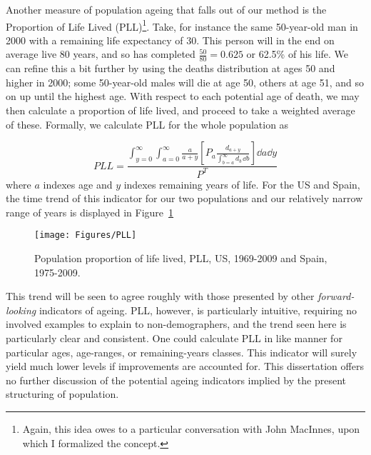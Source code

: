 Another measure of population ageing that falls out of our method is the
Proportion of Life Lived (PLL)\footnote{Again, this idea owes to a
particular conversation with John MacInnes, upon which I formalized the
concept.}. Take, for instance the same 50-year-old man in 2000 with a remaining life expectancy of
30. This person will in the end on average live 80 years, and so has completed
$\tfrac{50}{80} = 0.625$ or 62.5\% of his life. We can refine this a bit further
by using the deaths distribution at ages 50 and higher in 2000; some 50-year-old
males will die at age 50, others at age 51, and so on up until the highest age.
With respect to each potential age of death, we may then calculate a proportion
of life lived, and proceed to take a weighted average of these. Formally, we
calculate PLL for the whole population as

\begin{equation}
PLL = \frac{\int _{y = 0} ^\infty \int _{a = 0} ^\infty \frac{a}{a + y}
\left[ P_a
\frac{d_{a + y} }{ \int _{b = a} ^{\infty} d_b\, \dd b  }\right] \dd a \dd y }{
P^T }
\end{equation}
where $a$ indexes age and $y$ indexes remaining years of life. For the US and
Spain, the time trend of this indicator for our two populations and our
relatively narrow range of years is displayed in Figure~\ref{fig:PLL}
\begin{figure}
      \centering
      \caption{Population proportion of life lived, PLL, US, 1969-2009 and
      Spain, 1975-2009.}
         \texttt{[image: Figures/PLL]}
      \label{fig:PLL} 
\end{figure}

This trend will be seen to agree roughly with those presented by other
\textit{forward-looking} indicators of ageing. PLL, however, is particularly
intuitive, requiring no involved examples to explain to non-demographers, and
the trend seen here is particularly clear and consistent. One could
calculate PLL in like manner for particular ages, age-ranges, or remaining-years
classes. This indicator will surely yield much lower levels if improvements
are accounted for. This dissertation offers no further discussion of the
potential ageing indicators implied by the present structuring of population.

\FloatBarrier
